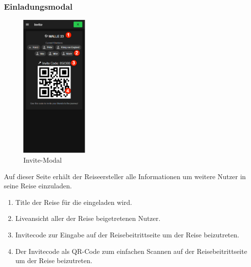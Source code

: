 \subsubsection{Einladungsmodal}\label{invite-modal}
\begin{figure}[H]
    \centering
    \includegraphics[width=0.3\textwidth]{img/pages_numbers/invite-modal.drawio}
    \caption[Invite-Modal]{Invite-Modal}
    \label{fig:invite-modal}
\end{figure}
Auf dieser Seite erhält der Reiseersteller alle Informationen um weitere Nutzer in seine Reise einzuladen.
\begin{enumerate}[label=\protect\circled{\arabic*}]
	\item Title der Reise für die eingeladen wird.
	\item Liveansicht aller der Reise beigetretenen Nutzer.
	\item Invitecode zur Eingabe auf der Reisebeitrittseite um der Reise beizutreten.
	\item Der Invitecode als QR-Code zum einfachen Scannen auf der Reisebeitrittseite um der Reise beizutreten.
\end{enumerate}

